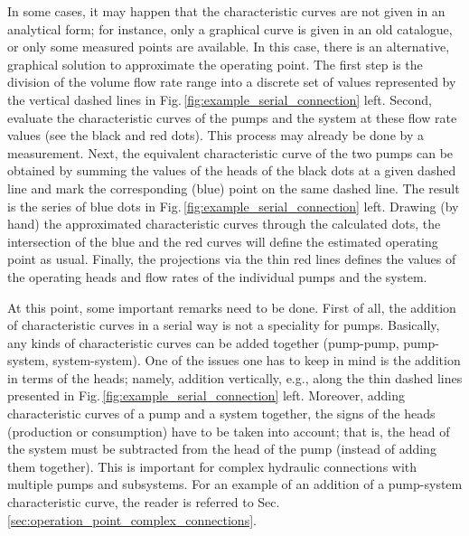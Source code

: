 In some cases, it may happen that the characteristic curves are not given in an analytical form; for instance, only a graphical curve is given in an old catalogue, or only some measured points are available. In this case, there is an alternative, graphical solution to approximate the operating point. The first step is the division of the volume flow rate range into a discrete set of values represented by the vertical dashed lines in Fig.\,\ref{fig:example_serial_connection} left. Second, evaluate the characteristic curves of the pumps and the system at these flow rate values (see the black and red dots). This process may already be done by a measurement. Next, the equivalent characteristic curve of the two pumps can be obtained by summing the values of the heads of the black dots at a given dashed line and mark the corresponding (blue) point on the same dashed line. The result is the series of blue dots in Fig.\,\ref{fig:example_serial_connection} left. Drawing (by hand) the approximated characteristic curves through the calculated dots, the intersection of the blue and the red curves will define the estimated operating point as usual. Finally, the projections via the thin red lines defines the values of the operating heads and flow rates of the individual pumps and the system.

At this point, some important remarks need to be done. First of all, the addition of characteristic curves in a serial way is not a speciality for pumps. Basically, any kinds of characteristic curves can be added together (pump-pump, pump-system, system-system). One of the issues one has to keep in mind is the addition in terms of the heads; namely, addition vertically, e.g., along the thin dashed lines presented in Fig.\,\ref{fig:example_serial_connection} left. Moreover, adding characteristic curves of a pump and a system together, the signs of the heads (production or consumption) have to be taken into account; that is, the head of the system must be subtracted from the head of the pump (instead of adding them together). This is important for complex hydraulic connections with multiple pumps and subsystems. For an example of an addition of a pump-system characteristic curve, the reader is referred to Sec.\,\ref{sec:operation_point_complex_connections}.

